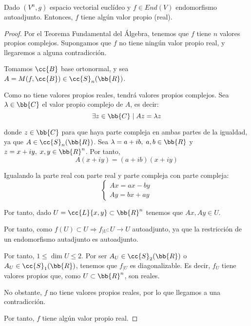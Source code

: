 \begin{lema}
    Dado $(V^n, g)$ espacio vectorial euclídeo y $f\in End(V)$ endomorfismo autoadjunto. Entonces, $f$ tiene algún valor propio (real).
\end{lema}
\begin{proof}
    Por el Teorema Fundamental del Álgebra, tenemos que $f$ tiene $n$ valores propios complejos. Supongamos que $f$ no tiene ningún valor propio real, y llegaremos a alguna contradicción.

    Tomamos $\cc{B}$ base ortonormal, y sea $A=M(f,\cc{B})\in \cc{S}_n(\bb{R})$.

    Como no tiene valores propios reales, tendrá valores propios complejos. Sea $\lambda\in \bb{C}$ el valor propio complejo de $A$, es decir:
    \begin{equation*}
        \exists z\in \bb{C}\mid Az=\lambda z
    \end{equation*}

    donde $z\in \bb{C}$ para que haya parte compleja en ambas partes de la igualdad, ya que $A\in \cc{S}_n(\bb{R})$. Sea $\lambda=a+ib,\;a,b\in \bb{R}$ y $z=x+iy,\;x,y\in\bb{R}^n$. Por tanto,
    \begin{equation*}
        A(x+iy) = (a+ib)(x+iy)
    \end{equation*}
    
    Igualando la parte real con parte real y parte compleja con parte compleja:
    \begin{equation*}
        \left\{\begin{array}{c}
            Ax = ax-by \\
            Ay=bx+ay
        \end{array} \right.
    \end{equation*}

    Por tanto, dado $U=\cc{L}\{x,y\}\subset \bb{R}^n$ tenemos que $Ax, Ay\in U$.
    
    Por tanto, como $f(U)\subset U \Longrightarrow f_{\left|U \right.}:U\to U$ autoadjunto, ya que la restricción de un endomorfismo autadjunto es autoadjunto.

    Por tanto, $1\leq \dim U \leq 2$. Por ser $A_U\in \cc{S}_2(\bb{R})$ o $A_U\in \cc{S}_1(\bb{R})$, tenemos que $f_{\left|U \right.}$ es diagonalizable. Es decir, $f_U$ tiene valores propios que, como $U\subset \bb{R}^n$, son reales.
    
    No obstante, $f$ no tiene valores propios reales, por lo que llegamos a una contradicción.

    Por tanto, $f$ tiene algún valor propio real.
\end{proof}

